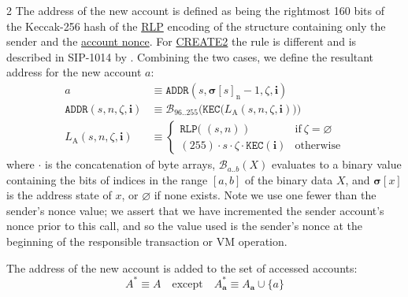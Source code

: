 \documentclass[9pt,oneside]{amsart}
\begin{document}
\begin{multicols}{2}
The address of the new account is defined as being the rightmost 160 bits of the Keccak-256 hash of the \hyperlink{rlp}{RLP} encoding of the structure containing only the sender and the \hyperlink{account_nonce}{account nonce}.
For {\small \hyperlink{create2}{CREATE2}} the rule is different and is described in SIP-1014 by \cite{SIP-1014}.
Combining the two cases, we define the resultant address for the new account $a$:
\begin{align}
a & \equiv \mathtt{ADDR}(s, \boldsymbol{\sigma}[s]_{\mathrm{n}} - 1, \zeta, \mathbf{i}) \\
\label{eq:new-address} \mathtt{ADDR}(s, n, \zeta, \mathbf{i}) & \equiv \mathcal{B}_{96..255}\Big(\mathtt{KEC}\big( L_{\mathrm{A}}(s, n, \zeta, \mathbf{i})\big) \Big) \\
L_{\mathrm{A}}(s, n, \zeta, \mathbf{i}) & \equiv \begin{cases}
\mathtt{RLP}\big(\;(s, n)\;\big) & \text{if}\ \zeta = \varnothing \\
(255) \cdot s \cdot \zeta \cdot \mathtt{KEC}(\mathbf{i}) & \text{otherwise}
\end{cases}
\end{align}
where $\cdot$ is the concatenation of byte arrays, $\mathcal{B}_{a..b}(X)$ evaluates to a binary value containing the bits of indices in the range $[a, b]$ of the binary data $X$, and $\boldsymbol{\sigma}[x]$ is the address state of $x$, or $\varnothing$ if none exists. Note we use one fewer than the sender's nonce value; we assert that we have incremented the sender account's nonce prior to this call, and so the value used is the sender's nonce at the beginning of the responsible transaction or VM operation.

The address of the new account is added to the set of accessed accounts:
\begin{equation}
A^* \equiv A \quad \text{except} \quad A^*_{\mathbf{a}} \equiv A_{\mathbf{a}} \cup \{a\}
\end{equation}


\end{multicols}
\end{document}
